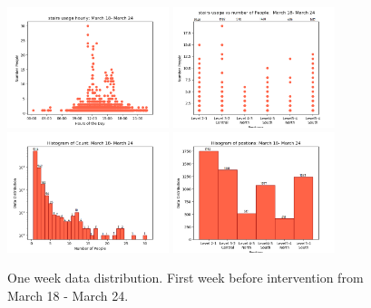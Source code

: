 \begin{figure}[t]
    \centering
      \includegraphics[width=0.42\textwidth]{image/Chapters/Chapter6/oneWeekBeforehourly.png}%
    \includegraphics[width=0.42\textwidth]{image/Chapters/Chapter6/PositionCountOneWeekBeforer.png}\hfill
    \includegraphics[width=0.42\textwidth]{image/Chapters/Chapter6/oneweekCountDistributonBefore.png}%
    \includegraphics[width=0.42\textwidth]{image/Chapters/Chapter6/oneweekBeforePositionDistributon.png}
    \caption{One week data distribution. First week before intervention from March 18 - March 24.}
    \label{distbefore}
\end{figure}

